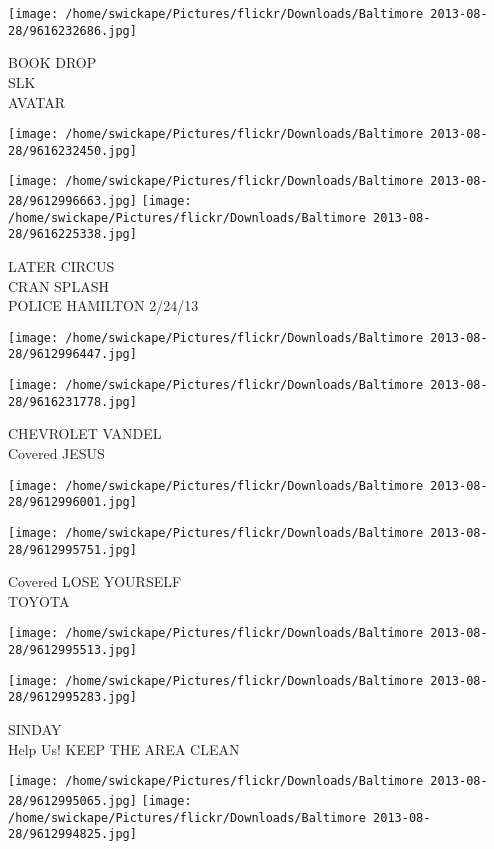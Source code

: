 \documentclass[10pt,letterpaper]{article}
\begin{document}
\texttt{[image: /home/swickape/Pictures/flickr/Downloads/Baltimore 2013-08-28/9616232686.jpg]}

BOOK DROP\\
SLK\\
AVATAR
\pagebreak

\texttt{[image: /home/swickape/Pictures/flickr/Downloads/Baltimore 2013-08-28/9616232450.jpg]}

\vspace{0.25in}
\texttt{[image: /home/swickape/Pictures/flickr/Downloads/Baltimore 2013-08-28/9612996663.jpg]}
\texttt{[image: /home/swickape/Pictures/flickr/Downloads/Baltimore 2013-08-28/9616225338.jpg]}

LATER CIRCUS\\
CRAN SPLASH\\
POLICE HAMILTON 2/24/13
\pagebreak

\texttt{[image: /home/swickape/Pictures/flickr/Downloads/Baltimore 2013-08-28/9612996447.jpg]}

\vspace{0.25in}
\texttt{[image: /home/swickape/Pictures/flickr/Downloads/Baltimore 2013-08-28/9616231778.jpg]}

CHEVROLET VANDEL\\
Covered JESUS
\pagebreak

\texttt{[image: /home/swickape/Pictures/flickr/Downloads/Baltimore 2013-08-28/9612996001.jpg]}

\vspace{0.25in}
\texttt{[image: /home/swickape/Pictures/flickr/Downloads/Baltimore 2013-08-28/9612995751.jpg]}

Covered LOSE YOURSELF\\
TOYOTA
\pagebreak

\texttt{[image: /home/swickape/Pictures/flickr/Downloads/Baltimore 2013-08-28/9612995513.jpg]}

\vspace{0.25in}
\texttt{[image: /home/swickape/Pictures/flickr/Downloads/Baltimore 2013-08-28/9612995283.jpg]}

SINDAY\\
Help Us! KEEP THE AREA CLEAN
\pagebreak

\texttt{[image: /home/swickape/Pictures/flickr/Downloads/Baltimore 2013-08-28/9612995065.jpg]}
\texttt{[image: /home/swickape/Pictures/flickr/Downloads/Baltimore 2013-08-28/9612994825.jpg]}
\end{document}

